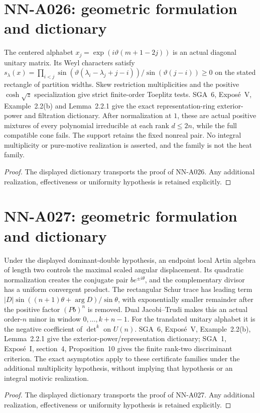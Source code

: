 \section{NN-A026: geometric formulation and dictionary}
\begin{geometricstatement}[NN-A026]
The centered alphabet $x_j=\exp(i\vartheta(m+1-2j))$ is an actual diagonal unitary matrix. Its Weyl characters satisfy $s_\lambda(x)=\prod_{i<j}\sin(\vartheta(\lambda_i-\lambda_j+j-i))/\sin(\vartheta(j-i))\ge0$ on the stated rectangle of partition widths. Skew restriction multiplicities and the positive $\cosh\sqrt z$ specialization give strict finite-order Toeplitz tests. SGA~6, Expos\'e~V, Example~2.2(b) and Lemma~2.2.1 give the exact representation-ring exterior-power and filtration dictionary. After normalization at $1$, these are actual positive mixtures of every polynomial irreducible at each rank $d\le2n$, while the full compatible cone fails. The support retains the fixed nonreal pair. No integral multiplicity or pure-motive realization is asserted, and the family is not the heat family.
\end{geometricstatement}
\begin{proof} The displayed dictionary transports the proof of NN-A026. Any additional realization, effectiveness or uniformity hypothesis is retained explicitly.\end{proof}


\section{NN-A027: geometric formulation and dictionary}
\begin{geometricstatement}[NN-A027]
Under the displayed dominant-double hypothesis, an endpoint local Artin algebra of length two controls the maximal scaled angular displacement. Its quadratic normalization creates the conjugate pair $be^{\pm i\theta}$, and the complementary divisor has a uniform convergent product. The rectangular Schur trace has leading term $|D|\sin((n+1)\theta+\arg D)/\sin\theta$, with exponentially smaller remainder after the positive factor $(Pb)^n$ is removed. Dual Jacobi--Trudi makes this an actual order-$n$ minor in window $0,\ldots,k+n-1$. For the translated unitary alphabet it is the negative coefficient of $\det^k$ on $U(n)$. SGA~6, Expos\'e~V, Example~2.2(b), Lemma~2.2.1 give the exterior-power/representation dictionary; SGA~1, Expos\'e~I, section~4, Proposition~10 gives the finite rank-two discriminant criterion. The exact asymptotics apply to these certificate families under the additional multiplicity hypothesis, without implying that hypothesis or an integral motivic realization.
\end{geometricstatement}
\begin{proof} The displayed dictionary transports the proof of NN-A027. Any additional realization, effectiveness or uniformity hypothesis is retained explicitly.\end{proof}


